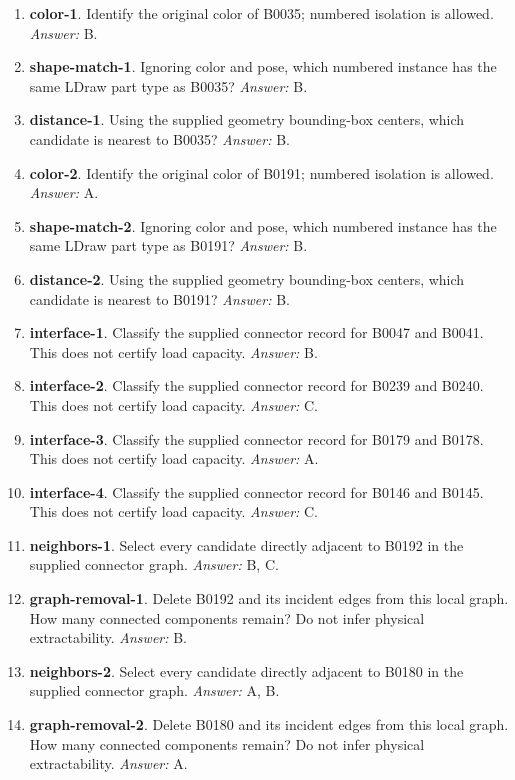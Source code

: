 \begin{enumerate}
\item \textbf{color-1}. Identify the original color of B0035; numbered isolation is allowed. \textit{Answer:} B.
\item \textbf{shape-match-1}. Ignoring color and pose, which numbered instance has the same LDraw part type as B0035? \textit{Answer:} B.
\item \textbf{distance-1}. Using the supplied geometry bounding-box centers, which candidate is nearest to B0035? \textit{Answer:} B.
\item \textbf{color-2}. Identify the original color of B0191; numbered isolation is allowed. \textit{Answer:} A.
\item \textbf{shape-match-2}. Ignoring color and pose, which numbered instance has the same LDraw part type as B0191? \textit{Answer:} B.
\item \textbf{distance-2}. Using the supplied geometry bounding-box centers, which candidate is nearest to B0191? \textit{Answer:} B.
\item \textbf{interface-1}. Classify the supplied connector record for B0047 and B0041. This does not certify load capacity. \textit{Answer:} B.
\item \textbf{interface-2}. Classify the supplied connector record for B0239 and B0240. This does not certify load capacity. \textit{Answer:} C.
\item \textbf{interface-3}. Classify the supplied connector record for B0179 and B0178. This does not certify load capacity. \textit{Answer:} A.
\item \textbf{interface-4}. Classify the supplied connector record for B0146 and B0145. This does not certify load capacity. \textit{Answer:} C.
\item \textbf{neighbors-1}. Select every candidate directly adjacent to B0192 in the supplied connector graph. \textit{Answer:} B, C.
\item \textbf{graph-removal-1}. Delete B0192 and its incident edges from this local graph. How many connected components remain? Do not infer physical extractability. \textit{Answer:} B.
\item \textbf{neighbors-2}. Select every candidate directly adjacent to B0180 in the supplied connector graph. \textit{Answer:} A, B.
\item \textbf{graph-removal-2}. Delete B0180 and its incident edges from this local graph. How many connected components remain? Do not infer physical extractability. \textit{Answer:} A.

\end{enumerate}
